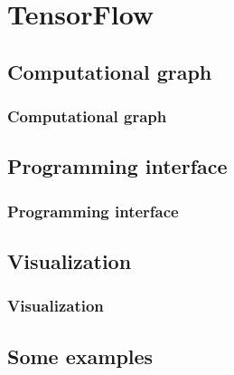 
\section{TensorFlow}\label{sec:TF}

\subsection{Computational graph}

\begin{frame}
  \MyLogo
  \frametitle{Computational graph}  

\end{frame}

\subsection{Programming interface}

\begin{frame}
  \MyLogo
  \frametitle{Programming interface}  

\end{frame}

\subsection{Visualization}

\begin{frame}
  \MyLogo
  \frametitle{Visualization}  

\end{frame}

\subsection{Some examples}


